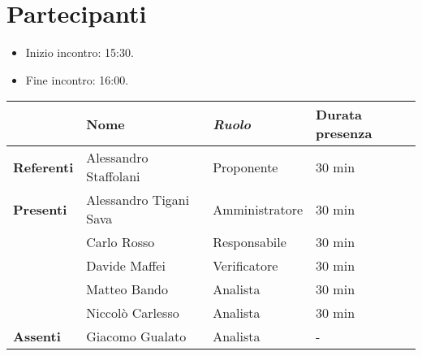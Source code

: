 \section*{Partecipanti}

\begin{itemize}
	\item Inizio incontro: 15:30.
	\item Fine incontro: 16:00.
\end{itemize}


\begin{center}
	{\renewcommand{\arraystretch}{1.5}
		\begin{tabular}{l|lll}
			                   & \textbf{Nome}          & \textit{Ruolo} & \textbf{Durata presenza} \\
			\hline
			\textbf{Referenti} & Alessandro Staffolani  & Proponente     & 30 min                   \\
			\hline
			\textbf{Presenti}  & Alessandro Tigani Sava & Amministratore & 30 min                   \\
			                   & Carlo Rosso            & Responsabile   & 30 min                   \\
			                   & Davide Maffei          & Verificatore   & 30 min                   \\
			                   & Matteo Bando        	& Analista       & 30 min                   \\
			                   & Niccolò Carlesso       & Analista       & 30 min                   \\
			\hline
			\textbf{Assenti}   & Giacomo Gualato        & Analista       & -                        \\
		\end{tabular}
	}
\end{center}
